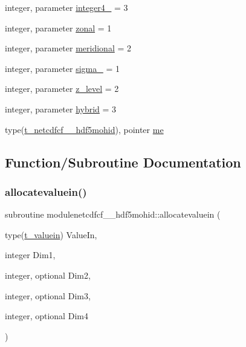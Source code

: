 \begin{DoxyCompactItemize}
\item 
integer, parameter \mbox{\hyperlink{namespacemodulenetcdfcf__2__hdf5mohid_a6451136b901733e7e33a2ad13c62d2ba}{integer4\+\_\+}} = 3
\item 
integer, parameter \mbox{\hyperlink{namespacemodulenetcdfcf__2__hdf5mohid_ad29870bbe3fad84a588db8bc5ab5fe1a}{zonal}} = 1
\item 
integer, parameter \mbox{\hyperlink{namespacemodulenetcdfcf__2__hdf5mohid_aeb24e32948307415ab69fb7b05de6ae7}{meridional}} = 2
\item 
integer, parameter \mbox{\hyperlink{namespacemodulenetcdfcf__2__hdf5mohid_aa77dc62d5ffd7b32add308a33868ad75}{sigma\+\_\+}} = 1
\item 
integer, parameter \mbox{\hyperlink{namespacemodulenetcdfcf__2__hdf5mohid_a43af71e0d1401256505ae84b237fdd16}{z\+\_\+level}} = 2
\item 
integer, parameter \mbox{\hyperlink{namespacemodulenetcdfcf__2__hdf5mohid_a6d038ac528c4242744ff281cef0b7b56}{hybrid}} = 3
\item 
type(\mbox{\hyperlink{structmodulenetcdfcf__2__hdf5mohid_1_1t__netcdfcf__2__hdf5mohid}{t\+\_\+netcdfcf\+\_\+\_\+hdf5mohid}}), pointer \mbox{\hyperlink{namespacemodulenetcdfcf__2__hdf5mohid_a5da8515dcb5378620b9fe7c77d3d47c6}{me}}
\end{DoxyCompactItemize}


\subsection{Function/\+Subroutine Documentation}
\mbox{\label{namespacemodulenetcdfcf__2__hdf5mohid_af854968676c4e6f1d5d76e704087ae86}} 
\subsubsection{\texorpdfstring{allocatevaluein()}{allocatevaluein()}}
{\footnotesize\ttfamily subroutine modulenetcdfcf\+\_\+\_\+hdf5mohid\+::allocatevaluein (\begin{DoxyParamCaption}\item[{type(\mbox{\hyperlink{structmodulenetcdfcf__2__hdf5mohid_1_1t__valuein}{t\+\_\+valuein}})}]{Value\+In,  }\item[{integer}]{Dim1,  }\item[{integer, optional}]{Dim2,  }\item[{integer, optional}]{Dim3,  }\item[{integer, optional}]{Dim4 }\end{DoxyParamCaption})\hspace{0.3cm}{\ttfamily [private]}}

